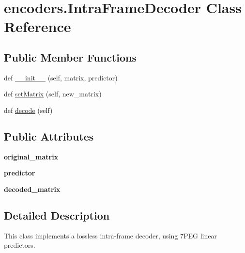 \hypertarget{classencoders_1_1IntraFrameDecoder}{}\section{encoders.\+Intra\+Frame\+Decoder Class Reference}
\label{classencoders_1_1IntraFrameDecoder}
\subsection*{Public Member Functions}
\begin{DoxyCompactItemize}
\item 
def \hyperlink{classencoders_1_1IntraFrameDecoder_a251ae11f0b35a2a53899d26595f3d6c4}{\+\_\+\+\_\+init\+\_\+\+\_\+} (self, matrix, predictor)
\item 
def \hyperlink{classencoders_1_1IntraFrameDecoder_af16e7a569f469d4b66ce3ca600136472}{set\+Matrix} (self, new\+\_\+matrix)
\item 
def \hyperlink{classencoders_1_1IntraFrameDecoder_a44b94a3f3b4ff4fb8f4b983980f9b7ba}{decode} (self)
\end{DoxyCompactItemize}
\subsection*{Public Attributes}
\begin{DoxyCompactItemize}
\item 
\mbox{\label{classencoders_1_1IntraFrameDecoder_ae71d0e177ac53de5ddc03da5c8eb77d6}} 
{\bfseries original\+\_\+matrix}
\item 
\mbox{\label{classencoders_1_1IntraFrameDecoder_a5c03b4ad8c7cae8518ab7edec2207a68}} 
{\bfseries predictor}
\item 
\mbox{\label{classencoders_1_1IntraFrameDecoder_a10b133c0f31605eec4de1647e18bf9dc}} 
{\bfseries decoded\+\_\+matrix}
\end{DoxyCompactItemize}


\subsection{Detailed Description}
\begin{DoxyVerb}This class implements a lossless intra-frame decoder, using 7PEG linear predictors.
\end{DoxyVerb}
 

